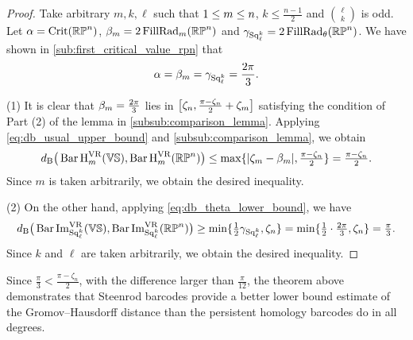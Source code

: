 \begin{proof}
	Take arbitrary $m, k, \ell$ such that $1 \leq m \leq n$, $k \leq \frac{n-1}{2}$ and $\binom{\ell}{k}$ is odd.
    Let $\alpha = \operatorname{Crit}(\mathbb{RP}^n)$, $\beta_m = 2\operatorname{FillRad}_{m}(\mathbb{RP}^n)$ and $\gamma_{\operatorname{Sq}_\ell^k}= 2\operatorname{FillRad}_{\theta}(\mathbb{RP}^n)$.
    We have shown in \cref{sub:first_critical_value_rpn} that
	$$
	\alpha = \beta_m = \gamma_{\operatorname{Sq}_\ell^k} = \frac{2\pi}{3}.
	$$
	
    (1) It is clear that %
    $\beta_m = \tfrac{2\pi}{3}$ lies in $\big[\zeta_n, \tfrac{\pi - \zeta_n}{2}+\zeta_m\big]$ satisfying the condition of Part (2) of the lemma in \cref{subsub:comparison_lemma}.
	Applying \cref{eq:db_usual_upper_bound} and \cref{subsub:comparison_lemma}, we obtain
	\[d_{\mathrm{B}}\big(\operatorname{Bar} \operatorname{H}_{m}^{\operatorname{VR}} (\mathbb{V}\mathbb{S}), \operatorname{Bar} \operatorname{H}_{m}^{\operatorname{VR}} (\mathbb{RP}^n)\big)
    \leq \max\{|\zeta_m  - \beta_m |, \tfrac{\pi - \zeta_n}{2}\}
    = \tfrac{\pi - \zeta_n}{2}.\]
    Since $m$ is taken arbitrarily, we obtain the desired inequality.
    
	(2) On the other hand, applying \cref{eq:db_theta_lower_bound}, we have
	\[\db\big(\sqbarcl{k}{\ell}{\VS}, \sqbarcl{k}{\ell}{\rp^n}\big)
	\geq \min\{\tfrac{1}{2}\gamma_{\Sq_\ell^k}, \zeta_n\}
	= \min\{\tfrac{1}{2}\cdot\tfrac{2\pi}{3}, \zeta_n\}
	= \tfrac{\pi}{3}.%
    \]
    Since $k$ and $\ell$ are taken arbitrarily, we obtain the desired inequality. 
\end{proof}

Since \(\tfrac{\pi}{3} < \tfrac{\pi - \zeta_n}{2}\), with the difference larger than \(\tfrac{\pi}{12}\), the theorem above demonstrates that Steenrod barcodes provide a better lower bound estimate of the Gromov--Hausdorff distance than the persistent homology barcodes do in all degrees.